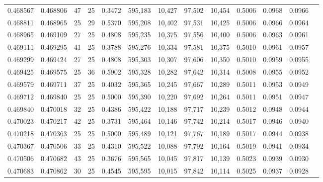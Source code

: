 \begin{tabular}{rrrrrrrrrrrrr}
0.468567 & 0.468806 &    47 &  25 &                                     0.3472 & 595,183 &  10,427 &  97,502 &  10,454 & 0.5006 & 0.0968 & 0.0966 \\
0.468811 & 0.468965 &    25 &  29 &                                     0.5370 & 595,208 &  10,402 &  97,531 &  10,425 & 0.5006 & 0.0966 & 0.0964 \\
0.468965 & 0.469109 &    27 &  25 &                                     0.4808 & 595,235 &  10,375 &  97,556 &  10,400 & 0.5006 & 0.0963 & 0.0961 \\
0.469111 & 0.469295 &    41 &  25 &                                     0.3788 & 595,276 &  10,334 &  97,581 &  10,375 & 0.5010 & 0.0961 & 0.0957 \\
0.469299 & 0.469424 &    27 &  25 &                                     0.4808 & 595,303 &  10,307 &  97,606 &  10,350 & 0.5010 & 0.0959 & 0.0955 \\
0.469425 & 0.469575 &    25 &  36 &                                     0.5902 & 595,328 &  10,282 &  97,642 &  10,314 & 0.5008 & 0.0955 & 0.0952 \\
0.469579 & 0.469711 &    37 &  25 &                                     0.4032 & 595,365 &  10,245 &  97,667 &  10,289 & 0.5011 & 0.0953 & 0.0949 \\
0.469712 & 0.469840 &    25 &  25 &                                     0.5000 & 595,390 &  10,220 &  97,692 &  10,264 & 0.5011 & 0.0951 & 0.0947 \\
0.469840 & 0.470018 &    32 &  25 &                                     0.4386 & 595,422 &  10,188 &  97,717 &  10,239 & 0.5012 & 0.0948 & 0.0944 \\
0.470023 & 0.470217 &    42 &  25 &                                     0.3731 & 595,464 &  10,146 &  97,742 &  10,214 & 0.5017 & 0.0946 & 0.0940 \\
0.470218 & 0.470363 &    25 &  25 &                                     0.5000 & 595,489 &  10,121 &  97,767 &  10,189 & 0.5017 & 0.0944 & 0.0938 \\
0.470367 & 0.470506 &    33 &  25 &                                     0.4310 & 595,522 &  10,088 &  97,792 &  10,164 & 0.5019 & 0.0941 & 0.0934 \\
0.470506 & 0.470682 &    43 &  25 &                                     0.3676 & 595,565 &  10,045 &  97,817 &  10,139 & 0.5023 & 0.0939 & 0.0930 \\
0.470683 & 0.470862 &    30 &  25 &                                     0.4545 & 595,595 &  10,015 &  97,842 &  10,114 & 0.5025 & 0.0937 & 0.0928 \\

\end{tabular}
